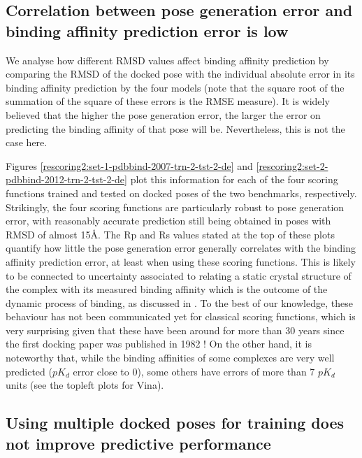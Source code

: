 \documentclass[twocolumn]{bmcart}
\begin{document}
\subsection*{Correlation between pose generation error and binding affinity prediction error is low}

We analyse how different RMSD values affect binding affinity prediction by comparing the RMSD of the docked pose with the individual absolute error in its binding affinity prediction by the four models (note that the square root of the summation of the square of these errors is the RMSE measure). It is widely believed that the higher the pose generation error, the larger the error on predicting the binding affinity of that pose will be. Nevertheless, this is not the case here.

Figures \ref{rescoring2:set-1-pdbbind-2007-trn-2-tst-2-de} and \ref{rescoring2:set-2-pdbbind-2012-trn-2-tst-2-de} plot this information for each of the four scoring functions trained and tested on docked poses of the two benchmarks, respectively. Strikingly, the four scoring functions are particularly robust to pose generation error, with reasonably accurate prediction still being obtained in poses with RMSD of almost 15\AA. The Rp and Rs values stated at the top of these plots quantify how little the pose generation error generally correlates with the binding affinity prediction error, at least when using these scoring functions. This is likely to be connected to uncertainty associated to relating a static crystal structure of the complex with its measured binding affinity which is the outcome of the dynamic process of binding, as discussed in \cite{1370}. To the best of our knowledge, these behaviour has not been communicated yet for classical scoring functions, which is very surprising given that these have been around for more than 30 years since the first docking paper was published in 1982 \cite{1668}! On the other hand, it is noteworthy that, while the binding affinities of some complexes are very well predicted ($pK_d$ error close to 0), some others have errors of more than 7 $pK_d$ units (see the topleft plots for Vina).

\subsection*{Using multiple docked poses for training does not improve predictive performance}
\end{document}
